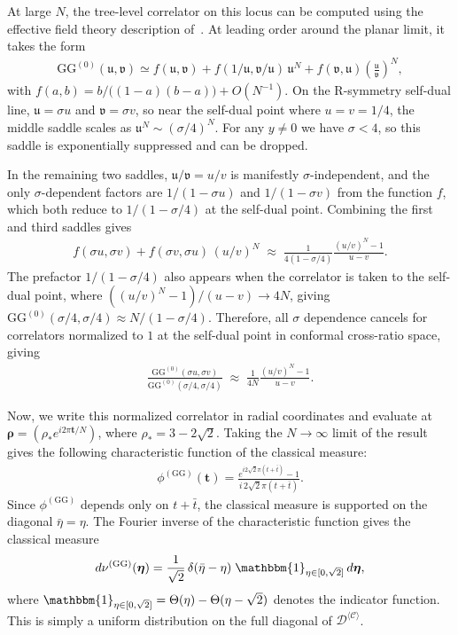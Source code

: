\documentclass[a4paper,11pt]{article}
\theoremstyle{plain}
\theoremstyle{definition}
\theoremstyle{remark}
\newcommand{\bs}[1]{\boldsymbol{#1}}
\newcommand{\ba}{\begin{equation} \begin{aligned}}
\newcommand{\ea}{\end{aligned} \end{equation}}
\begin{document}
At large $N$, the tree-level correlator on this locus can be computed using the effective field theory description of~\cite{Vescovi:2021fjf}. At leading order around the planar limit, it takes the form
\ba
\mathrm{GG}^{(0)}(\mathfrak{u},\mathfrak{v}) \simeq f(\mathfrak{u},\mathfrak{v}) + f(1/\mathfrak{u}, \mathfrak{v}/\mathfrak{u})\,\mathfrak{u}^N + f(\mathfrak{v},\mathfrak{u}) \left(\frac{\mathfrak{u}}{\mathfrak{v}}\right)^N,
\ea
with $f(a,b) = {b}/\big({(1-a)(b-a)}\big) + O(N^{-1})$. On the R-symmetry self-dual line, $\mathfrak{u} = \sigma u$ and $\mathfrak{v} = \sigma v$, so near the self-dual point where $u = v = 1/4$, the middle saddle scales as $\mathfrak{u}^N \sim (\sigma/4)^N$. For any $y \neq 0$ we have $\sigma < 4$, so this saddle is exponentially suppressed and can be dropped. 

In the remaining two saddles, $\mathfrak{u}/\mathfrak{v} = u/v$ is manifestly $\sigma$-independent, and the only $\sigma$-dependent factors are $1/(1-\sigma u)$ and $1/(1-\sigma v)$ from the function $f$, which both reduce to $1/(1-\sigma/4)$ at the self-dual point. Combining the first and third saddles gives
\ba
\label{eq:GGsaddles}
f(\sigma u, \sigma v) + f(\sigma v, \sigma u)\,(u/v)^N \;\approx\; \frac{1}{4(1-\sigma/4)} \frac{(u/v)^N - 1}{u - v}.
\ea
The prefactor $1/(1-\sigma/4)$ also appears when the correlator is taken to the self-dual point, where $((u/v)^N - 1)/(u - v) \to 4N$, giving $\mathrm{GG}^{(0)}(\sigma/4,\sigma/4) \approx N/(1-\sigma/4)$. Therefore, all $\sigma$ dependence cancels for correlators normalized to $1$ at the self-dual point in conformal cross-ratio space, giving
\ba
 \frac{\mathrm{GG}^{(0)}(\sigma u,\sigma v)}{\mathrm{GG}^{(0)}(\sigma/4,\sigma/4) } \;\approx\; \frac{1}{4N} \frac{(u/v)^N - 1}{u - v}.
\ea

Now, we write this normalized correlator in radial coordinates and evaluate at $\bs{\rho} = \left(\rho_* e^{i2\pi \bs{t}/N} \right)$, where $\rho_* = 3-2 \sqrt{2}$. Taking the $N\to\infty$ limit of the result gives the following characteristic function of the classical measure:
\ba
\phi^{(\mathrm{GG})}(\bs{t}) = \frac{e^{i 2\sqrt{2}\pi(t + \bar{t})} - 1}{i\, 2\sqrt{2}\pi(t + \bar{t})}.
\ea
Since $\phi^{(\mathrm{GG})}$ depends only on $t + \bar{t}$, the classical measure is supported on the diagonal $\bar{\eta} = \eta$. The Fourier inverse of the characteristic function gives the classical measure
\ba
\label{GGclassicalmeasure}
d\nu^{(\mathrm{GG})}(\bs{\eta}) = \frac{1}{\sqrt{2}}\,\delta(\bar{\eta} - \eta) \;\mathbbm{1}_{\eta \in [0,\sqrt{2}]}\, d\bs{\eta},
\ea
where $\mathbbm{1}_{\eta \in [0,\sqrt{2}]} = \Theta(\eta) - \Theta(\eta - \sqrt{2})$ denotes the indicator function. This is simply a uniform distribution on the full diagonal of $\mathcal{D}^{\langle \mathcal{C} \rangle}$.
\end{document}

